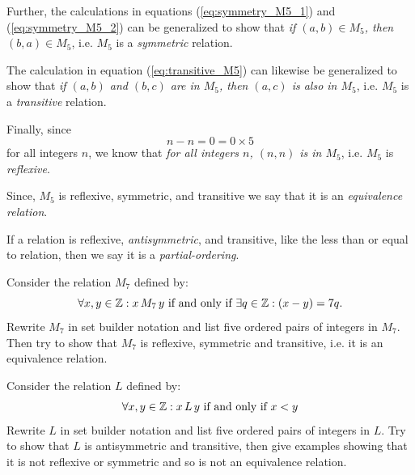 \begin{defn}
    Further, the calculations in equations (\ref{eq:symmetry_M5_1}) and (\ref{eq:symmetry_M5_2}) can be generalized to show that {\em if \((a,b)\in M_5\), then \((b,a)\in M_5\)}, i.e. \(M_5\) is a \emph{symmetric} relation.  
    
    The calculation in equation (\ref{eq:transitive_M5}) can likewise be generalized to show that {\em if \((a,b)\) and \((b,c)\) are in \(M_5\), then \((a,c)\) is also in \(M_5\)}, i.e. \(M_5\) is a \emph{transitive} relation.  
    
    Finally, since
    \begin{equation}\label{eq:reflexive_M5}
        n-n=0=0\times 5
    \end{equation}
    for all integers \(n\), we know that {\em for all integers \(n\), \((n,n)\) is in \(M_5\)}, i.e. \(M_5\) is \emph{reflexive}.

    Since, \(M_5\) is reflexive, symmetric, and transitive we say that it is an \emph{equivalence relation}.

    If a relation is reflexive, {\em antisymmetric}, and transitive, like the less than or equal to relation, then we say it is a \emph{partial-ordering}.
\end{defn}

\clearpage

\begin{practiceprob}
    Consider the relation \(M_7\) defined by:
    \begin{equation*}
        \forall x,y\in\bbZ: x\, M_7\,y\ \text{if and only if}\ \exists q\in\bbZ: (x-y)=7q.
    \end{equation*}
    Rewrite \(M_7\) in set builder notation and list five ordered pairs of integers in \(M_7\).  Then try to show that \(M_7\) is reflexive, symmetric and transitive, i.e. it is an equivalence relation.
    \vspace{0.3\textheight}
\end{practiceprob}

\begin{practiceprob}
    Consider the relation \(L\) defined by:
    \begin{equation*}
        \forall x,y\in\bbZ: x\, L\, y\ \text{if and only if}\ x< y
    \end{equation*}
    Rewrite \(L\) in set builder notation and list five ordered pairs of integers in \(L\).  Try to show that \(L\) is antisymmetric and transitive, then give examples showing that it is not reflexive or symmetric and so is not an equivalence relation.
    \vspace{0.3\textheight}
\end{practiceprob}

